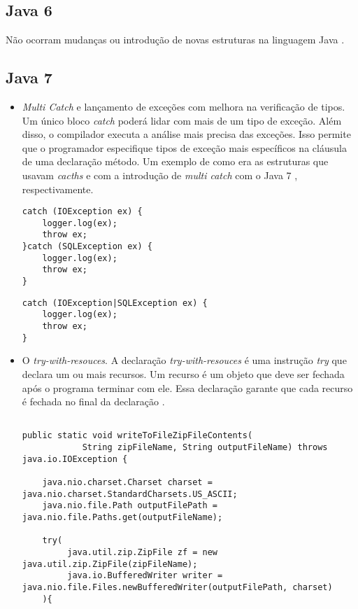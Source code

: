   
  
	\subsection {Java 6}
		Não ocorram mudanças ou introdução de novas estruturas na linguagem Java \cite{JSE8_Enhancements}.
	
	\subsection {Java 7}
		\begin{itemize}
		  \item {\it Multi Catch} e lançamento de exceções com melhora na verificação de tipos. Um único bloco {\it catch} poderá lidar com mais de um tipo de exceção. Além disso, o compilador executa a análise mais precisa das exceções. Isso permite que o programador especifique tipos de exceção mais específicos na cláusula de uma declaração método. Um exemplo de como era as estruturas que usavam {\it cacths} e com a introdução de {\it multi catch} com o Java 7  \cite{JSE7}, respectivamente.
  

\begin{lstlisting}
catch (IOException ex) {
	logger.log(ex);
	throw ex;
}catch (SQLException ex) {
	logger.log(ex);
	throw ex;
}
\end{lstlisting}
\clearpage
\begin{lstlisting}
catch (IOException|SQLException ex) {
	logger.log(ex);
	throw ex;
}
\end{lstlisting}


 \item O {\it try-with-resouces}. A declaração {\it try-with-resouces} é uma instrução {\it try} que declara um ou mais recursos. Um recurso é um objeto que deve ser fechada após o programa terminar com ele. Essa declaração garante que cada recurso é fechada no final da declaração \cite{JSE7_Advanced}.
	 
\begin{lstlisting}

public static void writeToFileZipFileContents(
			String zipFileName, String outputFileName) throws java.io.IOException {
	
	java.nio.charset.Charset charset = java.nio.charset.StandardCharsets.US_ASCII;
	java.nio.file.Path outputFilePath = java.nio.file.Paths.get(outputFileName);
	
	try(
		 java.util.zip.ZipFile zf = new java.util.zip.ZipFile(zipFileName);
		 java.io.BufferedWriter writer = java.nio.file.Files.newBufferedWriter(outputFilePath, charset)
	){
	

\end{lstlisting}
\end{itemize}
